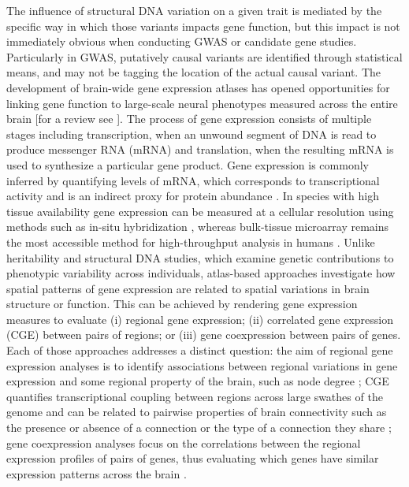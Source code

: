 The influence of structural DNA variation on a given trait is mediated by the specific way in which those variants impacts gene function, but this impact is not immediately obvious when conducting GWAS or candidate gene studies. Particularly in GWAS, putatively causal variants are identified through statistical means, and may not be tagging the location of the actual causal variant. The development of brain-wide gene expression atlases \citep{Harris2010,Hawrylycz2012,Lein2007a} has opened opportunities for linking gene function to large-scale neural phenotypes measured across the entire brain [for a review see \citet{Fornito2019}]. The process of gene expression consists of multiple stages including transcription, when an unwound segment of DNA is read to produce messenger RNA (mRNA) and translation, when the resulting mRNA is used to synthesize a particular gene product. Gene expression is commonly inferred by quantifying levels of mRNA, which corresponds to transcriptional activity and is an indirect proxy for protein abundance \citep{Liu2016}. In species with high tissue availability gene expression can be measured at a cellular resolution using methods such as in-situ hybridization \citep{Lein2007a,Unger2010}, whereas bulk-tissue microarray \citep{Schulze2001} remains the most accessible method for high-throughput analysis in humans \citep{Hawrylycz2012}. Unlike heritability and structural DNA studies, which examine genetic contributions to phenotypic variability across individuals, atlas-based approaches investigate how spatial patterns of gene expression are related to spatial variations in brain structure or function. This can be achieved by rendering gene expression measures to evaluate (i) regional gene expression; (ii) correlated gene expression (CGE) between pairs of regions; or (iii) gene coexpression between pairs of genes. Each of those approaches addresses a distinct question: the aim of regional gene expression analyses is to identify associations between regional variations in gene expression and some regional property of the brain, such as node degree \citep{French2011}; CGE quantifies transcriptional coupling between regions across large swathes of the genome and can be related to pairwise properties of brain connectivity such as the presence or absence of a connection or the type of a connection they share \citep{Arnatkeviciute2018,Fulcher2016,Richiardi2015}; gene coexpression analyses focus on the correlations between the regional expression profiles of pairs of genes, thus evaluating which genes have similar expression patterns across the brain \citep{Forest2017}. 

